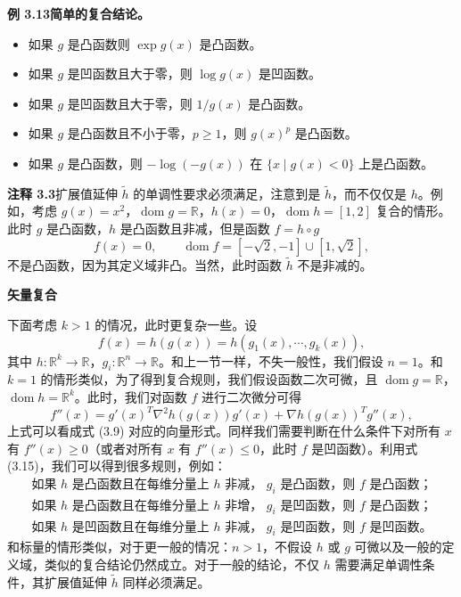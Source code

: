 \documentclass[UTF8, 12pt, fontset=fandol, oneside]{ctexart}
\DeclareMathOperator{\dom}{dom}
\begin{document}
\noindent\textbf{例 3.13\quad 简单的复合结论。}
\begin{itemize}
\item 如果 $g$ 是凸函数则 $\exp g(x)$ 是凸函数。
\item 如果 $g$ 是凹函数且大于零，则 $\log g(x)$ 是凹函数。
\item 如果 $g$ 是凹函数且大于零，则 $1/g(x)$ 是凸函数。
\item 如果 $g$ 是凸函数且不小于零，$p\geq1$，则 $g(x)^p$ 是凸函数。
\item 如果 $g$ 是凸函数，则 $-\log(-g(x))$ 在 $\{x\mid g(x)<0\}$ 上是凸函数。
\end{itemize}

\noindent\textbf{注释 3.3}\quad 扩展值延伸 $\tilde h$ 的单调性要求必须满足，注意到是 $\tilde h$，而不仅仅是 $h$。例如，考虑 $g(x)=x^2$，$\dom g=\mathbb{R}$，$h(x)=0$，$\dom h=[1,2]$ 复合的情形。此时 $g$ 是凸函数，$h$ 是凸函数且非减，但是函数 $f=h\circ g$
\[
f(x)=0,\qquad \dom f=[-\sqrt{2},-1]\cup[1,\sqrt{2}],
\]
不是凸函数，因为其定义域非凸。当然，此时函数 $\tilde h$ 不是非减的。

\noindent\textbf{矢量复合}

下面考虑 $k>1$ 的情况，此时更复杂一些。设
\[
f(x)=h(g(x))=h(g_1(x),\cdots,g_k(x)),
\]
其中 $h:\mathbb{R}^k\to\mathbb{R}$，$g_i:\mathbb{R}^n\to\mathbb{R}$。和上一节一样，不失一般性，我们假设 $n=1$。和 $k=1$ 的情形类似，为了得到复合规则，我们假设函数二次可微，且 $\dom g=\mathbb{R}$，$\dom h=\mathbb{R}^k$。此时，我们对函数 $f$ 进行二次微分可得
\begin{equation}
f''(x)=g'(x)^T\nabla^2 h(g(x))g'(x)+\nabla h(g(x))^Tg''(x),
\tag{3.15}
\end{equation}
上式可以看成式 (3.9) 对应的向量形式。同样我们需要判断在什么条件下对所有 $x$ 有 $f''(x)\geq0$（或者对所有 $x$ 有 $f''(x)\leq0$，此时 $f$ 是凹函数）。利用式 (3.15)，我们可以得到很多规则，例如：
\[
\begin{array}{ll}
\text{如果 }h\text{ 是凸函数且在每维分量上 }h\text{ 非减， }g_i\text{ 是凸函数，则 }f\text{ 是凸函数；}\\
\text{如果 }h\text{ 是凸函数且在每维分量上 }h\text{ 非增， }g_i\text{ 是凹函数，则 }f\text{ 是凸函数；}\\
\text{如果 }h\text{ 是凹函数且在每维分量上 }h\text{ 非减， }g_i\text{ 是凹函数，则 }f\text{ 是凹函数。}
\end{array}
\]
和标量的情形类似，对于更一般的情况：$n>1$，不假设 $h$ 或 $g$ 可微以及一般的定义域，类似的复合结论仍然成立。对于一般的结论，不仅 $h$ 需要满足单调性条件，其扩展值延伸 $\tilde h$ 同样必须满足。
\end{document}
